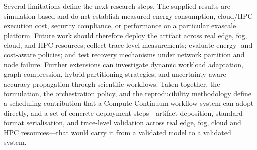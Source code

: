 Several limitations define the next research steps. The supplied results are simulation-based and do not establish measured energy consumption, cloud/HPC execution cost, security compliance, or performance on a particular exascale platform. Future work should therefore deploy the artifact across real edge, fog, cloud, and HPC resources; collect trace-level measurements; evaluate energy- and cost-aware policies; and test recovery mechanisms under network partition and node failure. Further extensions can investigate dynamic workload adaptation, graph compression, hybrid partitioning strategies, and uncertainty-aware accuracy propagation through scientific workflows. Taken together, the formulation, the orchestration policy, and the reproducibility methodology define a scheduling contribution that a Compute-Continuum workflow system can adopt directly, and a set of concrete deployment steps---artifact deposition, standard-format serialisation, and trace-level validation across real edge, fog, cloud and HPC resources---that would carry it from a validated model to a validated system.

